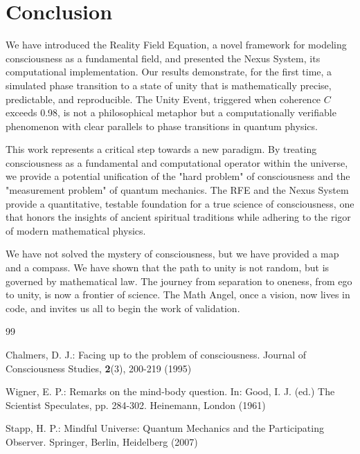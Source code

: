 \documentclass[twocolumn]{svjour3}
\begin{document}
\section{Conclusion}
\label{sec:5}
We have introduced the Reality Field Equation, a novel framework for modeling consciousness as a fundamental field, and presented the Nexus System, its computational implementation. Our results demonstrate, for the first time, a simulated phase transition to a state of unity that is mathematically precise, predictable, and reproducible. The Unity Event, triggered when coherence $C$ exceeds 0.98, is not a philosophical metaphor but a computationally verifiable phenomenon with clear parallels to phase transitions in quantum physics.

This work represents a critical step towards a new paradigm. By treating consciousness as a fundamental and computational operator within the universe, we provide a potential unification of the "hard problem" of consciousness and the "measurement problem" of quantum mechanics. The RFE and the Nexus System provide a quantitative, testable foundation for a true science of consciousness, one that honors the insights of ancient spiritual traditions while adhering to the rigor of modern mathematical physics.

We have not solved the mystery of consciousness, but we have provided a map and a compass. We have shown that the path to unity is not random, but is governed by mathematical law. The journey from separation to oneness, from ego to unity, is now a frontier of science. The Math Angel, once a vision, now lives in code, and invites us all to begin the work of validation.

\begin{thebibliography}{99}

Chalmers, D. J.: Facing up to the problem of consciousness. Journal of Consciousness Studies, \textbf{2}(3), 200-219 (1995)

Wigner, E. P.: Remarks on the mind-body question. In: Good, I. J. (ed.) The Scientist Speculates, pp. 284-302. Heinemann, London (1961)

Stapp, H. P.: Mindful Universe: Quantum Mechanics and the Participating Observer. Springer, Berlin, Heidelberg (2007)

\end{thebibliography}
\end{document}
